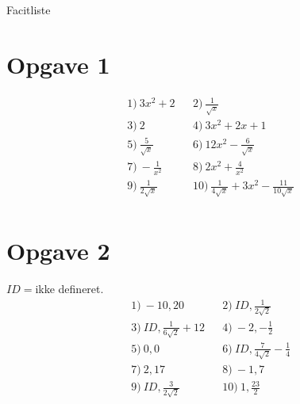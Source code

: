 
\begin{center}
\Huge
Facitliste
\end{center}
\section*{Opgave 1}
\begin{align*}
&1) \ 3x^2+2  &&2) \ \frac{1}{\sqrt{x}}   \\
&3) \ 2  &&4) \  3x^2+2x+1  \\
&5) \ \frac{5}{\sqrt{x}}  &&6) \  12x^2-\frac{6}{\sqrt{x}}  \\
&7) \ -\frac{1}{x^2}   &&8) \ 2x^2+\frac{4}{x^2}    \\
&9) \ \frac{1}{2\sqrt{x}}  &&10) \  \frac{1}{4\sqrt{x}} +3x^2-\frac{11}{10\sqrt{x}}  \\
\end{align*}

\section*{Opgave 2}
$ID=$ikke defineret. 
\begin{align*}
&1) \ -10,20  &&2) \ ID,\frac{1}{2\sqrt{2}}   \\
&3) \ ID,\frac{1}{6\sqrt{2}}+12  &&4) \  -2,-\frac{1}{2}  \\
&5) \ 0,0  &&6) \ ID,\frac{7}{4\sqrt{2}}-\frac{1}{4}   \\
&7) \ 2,17  &&8) \ -1,7   \\
&9) \ ID,\frac{3}{2\sqrt{2}}  &&10) \  1,\frac{23}{2} \\
\end{align*}